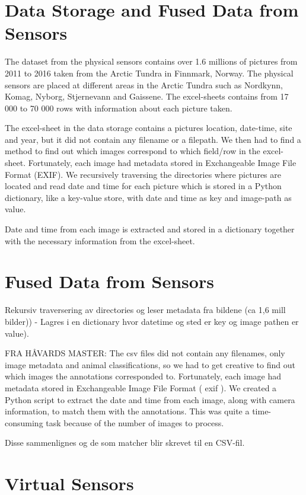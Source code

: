 \documentclass[USenglish]{uit-thesis}
\begin{document}
\section{Data Storage and Fused Data from Sensors}
The dataset from the physical sensors contains over 1.6 millions of pictures from 2011 to 2016 taken from the Arctic Tundra in Finnmark, Norway. The physical sensors are placed at different areas in the Arctic Tundra such as Nordkynn, Komag, Nyborg, Stjernevann and Gaissene.
The excel-sheets contains from 17 000 to 70 000 rows with information about each picture taken.

The excel-sheet in the data storage contains a pictures location, date-time, site and year, but it did not contain any filename or a filepath. We then had to find a method to find out which images correspond to which field/row in the excel-sheet. Fortunately, each image had metadata stored in Exchangeable Image File Format (EXIF). We recursively traversing the directories where pictures are located and read date and time for each picture which is stored in a Python dictionary, like a key-value store, with date and time as key and image-path as value.


Date and time from each image is extracted and stored in a dictionary together with the necessary information from the excel-sheet.


\section{Fused Data from Sensors}




Rekursiv traversering av directories og leser metadata fra bildene (ca 1,6 mill bilder)) - Lagres i en dictionary hvor datetime og sted er key og image pathen er value).


FRA HÅVARDS MASTER: The csv files did not contain any filenames,
only image metadata and animal classifications, so we had to get creative
to find out which images the annotations corresponded to. Fortunately, each
image had metadata stored in Exchangeable Image File Format ( exif ). We
created a Python script to extract the date and time from each image, along
with camera information, to match them with the annotations. This was quite
a time-consuming task because of the number of images to process.

Disse sammenlignes og de som matcher blir skrevet til en CSV-fil.
\section{Virtual Sensors}
\end{document}
